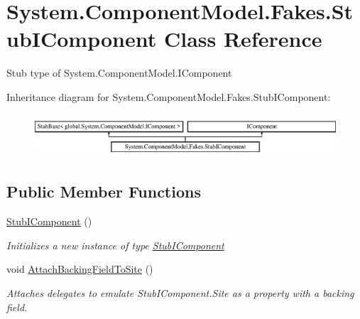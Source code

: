 \hypertarget{class_system_1_1_component_model_1_1_fakes_1_1_stub_i_component}{\section{System.\-Component\-Model.\-Fakes.\-Stub\-I\-Component Class Reference}
\label{class_system_1_1_component_model_1_1_fakes_1_1_stub_i_component}
}


Stub type of System.\-Component\-Model.\-I\-Component 


Inheritance diagram for System.\-Component\-Model.\-Fakes.\-Stub\-I\-Component\-:\begin{figure}[H]
\begin{center}
\leavevmode
\includegraphics[height=1.613833cm]{class_system_1_1_component_model_1_1_fakes_1_1_stub_i_component}
\end{center}
\end{figure}
\subsection*{Public Member Functions}
\begin{DoxyCompactItemize}
\item 
\hyperlink{class_system_1_1_component_model_1_1_fakes_1_1_stub_i_component_abadd95c08b9577008b7d61fe8b954d9f}{Stub\-I\-Component} ()
\begin{DoxyCompactList}\small\item\em Initializes a new instance of type \hyperlink{class_system_1_1_component_model_1_1_fakes_1_1_stub_i_component}{Stub\-I\-Component}\end{DoxyCompactList}\item 
void \hyperlink{class_system_1_1_component_model_1_1_fakes_1_1_stub_i_component_ae0cf0e6f18e01a07a9bbacfbdc302abd}{Attach\-Backing\-Field\-To\-Site} ()
\begin{DoxyCompactList}\small\item\em Attaches delegates to emulate Stub\-I\-Component.\-Site as a property with a backing field.\end{DoxyCompactList}\end{DoxyCompactItemize}
